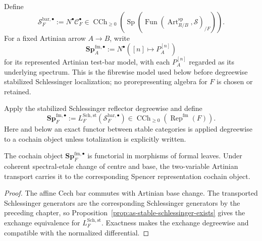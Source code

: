 \begin{definition}
\label{def:as-raw-artinian-bar-coefficient}
Define
\[
\boxed{
    \mathcal S_F^{\mathrm{bar},\bullet}
    :=
    N^\bullet\mathscr C_F^\bullet
    \in
    \operatorname{CCh}_{\geq0}
    \left(
        \operatorname{Sp}
        \left(
            \operatorname{Fun}
            (\operatorname{Art}^{\mathrm{sp}}_{R/B},\mathcal S)_{/F}
        \right)
    \right).
}
\]
For a fixed Artinian arrow $A\to B$, write
\[
\boxed{
    \mathbf{Sp}_{A}^{\mathrm{fm},\bullet}
    :=
    N^\bullet
    \left(
        [n]\longmapsto P_A^{[n]}
    \right)
}
\]
for its represented Artinian test-bar model, with each $P_A^{[n]}$ regarded
as its underlying spectrum.  This is the fibrewise model used below before
degreewise stabilized Schlessinger localization; no prorepresenting algebra
for $F$ is chosen or retained.
\end{definition}

\begin{definition}
\label{def:as-formal-leaf-spencer-representation}
Apply the stabilized Schlessinger reflector degreewise and define
\[
\boxed{
    \mathbf{Sp}_{F}^{\mathrm{fm},\bullet}
    :=
    L_F^{\mathrm{Sch,st}}
    \left(
        \mathcal S_F^{\mathrm{bar},\bullet}
    \right)
    \in
    \operatorname{CCh}_{\geq0}
    \left(
        \operatorname{Rep}^{\mathrm{fm}}(F)
    \right).
}
\]
Here and below an exact functor between stable categories is applied
degreewise to a cochain object unless totalization is explicitly written.
\end{definition}

\begin{proposition}
\label{prop:as-linear-spencer-reflector}
The cochain object
$\mathbf{Sp}_{F}^{\mathrm{fm},\bullet}$ is functorial in morphisms of formal
leaves.  Under coherent spectral-etale change of centre and base, the
two-variable Artinian transport carries it to the corresponding Spencer
representation cochain object.
\end{proposition}

\begin{proof}
The affine Cech bar commutes with Artinian base change.  The transported
Schlessinger generators are the corresponding Schlessinger generators by the
preceding chapter, so
Proposition~\ref{prop:as-stable-schlessinger-exists} gives the exchange
equivalence for $L_F^{\mathrm{Sch,st}}$.  Exactness makes the exchange
degreewise and compatible with the normalized differential.
\end{proof}

